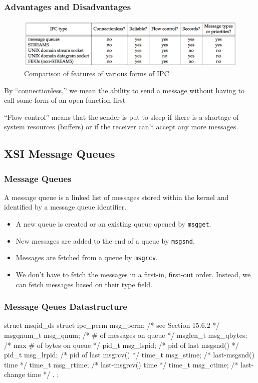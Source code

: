 \documentclass[newPxFont,sthlmFooter,nooffset]{beamer}
\begin{document}
\begin{frame}[t]
  \frametitle{Advantages and Disadvantages}
  \begin{figure}[h]
    \centering
    \includegraphics[width=\linewidth]{figures/fig15_25-comparison.png}
    \caption{Comparison of features of various forms of IPC}
  \end{figure}

By ``connectionless,'' we mean the ability to send a message without having to call some form of an open function first

``Flow control'' means that the sender is put to sleep if there is a shortage of system resources (buffers) or if the receiver can’t accept any more messages. 
\end{frame}


\subsection{XSI Message Queues}
\begin{frame}[t]
  \frametitle{Message Queues}
A message queue is a linked list of messages stored within the kernel and identified by a message queue identifier. 
\begin{itemize}
\item A new queue is created or an existing queue opened by \texttt{msgget}.
\item New messages are added to the end of a queue by \texttt{msgsnd}.
\item Messages are fetched from a queue by \texttt{msgrcv}. 
\item We don’t have to fetch the messages in a first-in, first-out order. Instead, we can fetch messages based on their type field.
\end{itemize}
\end{frame}



\begin{frame}[t, fragile]
  \frametitle{Message Qeues Datastructure}
\begin{codedefnb}
struct msqid_ds {
  struct ipc_perm  msg_perm;   /* see Section 15.6.2 */
  msgqnum_t        msg_qnum;   /* # of messages on queue */
  msglen_t         msg_qbytes; /* max # of bytes on queue */
  pid_t            msg_lspid;  /* pid of last msgsnd() */
  pid_t            msg_lrpid;  /* pid of last msgrcv() */
  time_t           msg_stime;  /* last-msgsnd() time */
  time_t           msg_rtime;  /* last-msgrcv() time */
  time_t           msg_ctime;  /* last-change time */
. };  
\end{codedefnb}
\end{frame}
\end{document}
